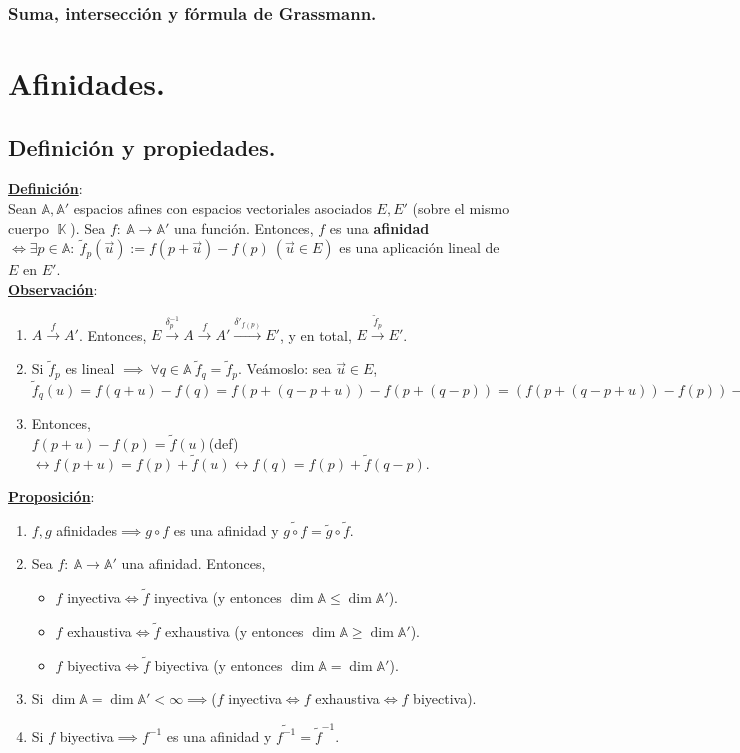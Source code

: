 \documentclass[11pt]{article}
\newcommand{\af}{\mathbb{A}}
\newcommand{\defi}{\underline{\textbf{Definición}}:\\}
\newcommand{\prop}{\underline{\textbf{Proposición}}:\\}
\newcommand{\obs}{\underline{\textbf{Observación}}: }
\DeclareMathOperator{\cuerpo}{\mathbb{K}}
\begin{document}
\subsubsection{Suma, intersección y fórmula de Grassmann.}
\newpage
\section{Afinidades.}
\subsection{Definición y propiedades.}
\defi Sean $\af,\af'$ espacios afines con espacios vectoriales asociados $E,E'$ (sobre el mismo cuerpo $\cuerpo$). Sea $f:\ \af\rightarrow\af'$ una función. Entonces, $f$ es una \textbf{afinidad}$\iff\exists p\in\af:\ \tilde{f}_p(\vec{u}):=f(p+\vec{u})-f(p)\ (\vec{u}\in E)$ es una aplicación lineal de $E$ en $E'$.\\
\obs \begin{enumerate}
	\item $A\xrightarrow{f}A'$. Entonces, $E\xrightarrow{\delta_p^{-1}}A\xrightarrow{f}A'\xrightarrow{\delta'_{f(p)}}E'$, y en total, $E\xrightarrow{\tilde{f}_p}E'$.
	\item Si $\tilde{f}_p$ es lineal $\implies\ \forall q\in\af\ \tilde{f}_q=\tilde{f}_p.$ Veámoslo: sea $\vec{u}\in E$,\\
	$\tilde{f}_q(u)=f(q+u)-f(q)=f(p+(q-p+u))-f(p+(q-p))=(f(p+(q-p+u))-f(p))-(f(p+(q-p))-f(p))=\tilde{f}_p((q-p)+u)-\tilde{f}_p(q-p)=\tilde{f}_p(u)+\tilde{f}_p(q-p)-\tilde{f}_p(q-p)=\tilde{f}_p(u).\square$
	\item Entonces,\\
	$f(p+u)-f(p)=\tilde{f}(u)$(def)$\leftrightarrow f(p+u)=f(p)+\tilde{f}(u)\leftrightarrow f(q)=f(p)+\tilde{f}(q-p).$
\end{enumerate}
\prop \begin{enumerate}
	\item $f,g$ afinidades$\implies g\circ f$ es una afinidad y $\tilde{g\circ f}=\tilde{g}\circ\tilde{f}$.
	\item Sea $f:\ \af\rightarrow\af'$ una afinidad. Entonces,
	\begin{itemize}
		\item $f$ inyectiva$\iff\tilde{f}$ inyectiva (y entonces $\dim\af\leq\dim\af'$).
		\item $f$ exhaustiva$\iff\tilde{f}$ exhaustiva (y entonces $\dim\af\geq\dim\af'$).
		\item $f$ biyectiva$\iff\tilde{f}$ biyectiva (y entonces $\dim\af=\dim\af'$).
	\end{itemize}
	\item Si $\dim\af=\dim\af'<\infty\implies$($f$ inyectiva$\iff f$ exhaustiva$\iff f$ biyectiva).
	\item Si $f$ biyectiva$\implies f^{-1}$ es una afinidad y $\tilde{f^{-1}}=\tilde{f}^{-1}$.
\end{enumerate}
\end{document}
